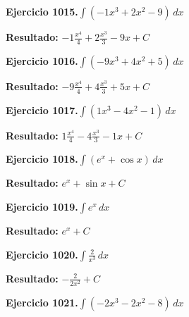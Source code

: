 \documentclass[10pt,a4paper]{article}
\begin{document}
\newpage
\begin{ejbox}
\textbf{Ejercicio 1015.}\quad $\int (-1x^3 +2x^2 -9)\,dx$
\end{ejbox}

\begin{solbox}
\textbf{Resultado:} \(\displaystyle -1\frac{x^4}{4} +2\frac{x^3}{3} -9x + C\)
\end{solbox}

\begin{ejbox}
\textbf{Ejercicio 1016.}\quad $\int (-9x^3 +4x^2 +5)\,dx$
\end{ejbox}

\begin{solbox}
\textbf{Resultado:} \(\displaystyle -9\frac{x^4}{4} +4\frac{x^3}{3} +5x + C\)
\end{solbox}

\begin{ejbox}
\textbf{Ejercicio 1017.}\quad $\int (1x^3 -4x^2 -1)\,dx$
\end{ejbox}

\begin{solbox}
\textbf{Resultado:} \(\displaystyle 1\frac{x^4}{4} -4\frac{x^3}{3} -1x + C\)
\end{solbox}

\newpage
\begin{ejbox}
\textbf{Ejercicio 1018.}\quad $\int (e^x + \cos x)\,dx$
\end{ejbox}

\begin{solbox}
\textbf{Resultado:} \(\displaystyle e^x + \sin x + C\)
\end{solbox}

\begin{ejbox}
\textbf{Ejercicio 1019.}\quad $\int e^x\,dx$
\end{ejbox}

\begin{solbox}
\textbf{Resultado:} \(\displaystyle e^x + C\)
\end{solbox}

\begin{ejbox}
\textbf{Ejercicio 1020.}\quad $\int \frac{2}{x^{3}}\,dx$
\end{ejbox}

\begin{solbox}
\textbf{Resultado:} \(\displaystyle -\frac{2}{2x^{2}} + C\)
\end{solbox}

\newpage
\begin{ejbox}
\textbf{Ejercicio 1021.}\quad $\int (-2x^3 -2x^2 -8)\,dx$
\end{ejbox}
\end{document}
